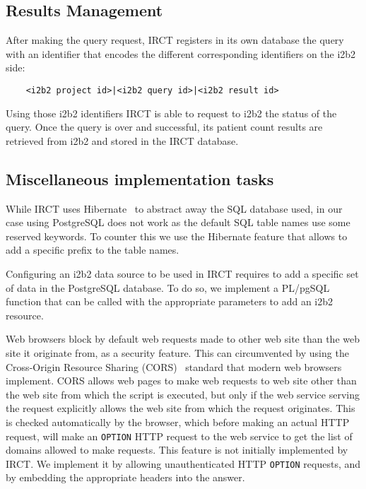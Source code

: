 \subsection{Results Management}

After making the query request, IRCT registers in its own database the query with an identifier that encodes the different corresponding identifiers on the i2b2 side:
\begin{verbatim}
    <i2b2 project id>|<i2b2 query id>|<i2b2 result id>
\end{verbatim}

Using those i2b2 identifiers IRCT is able to request to i2b2 the status of the query.
Once the query is over and successful, its patient count results are retrieved from i2b2 and stored in the IRCT database.


\subsection{Miscellaneous implementation tasks}

While IRCT uses Hibernate~\cite{todo} to abstract away the SQL database used, in our case using PostgreSQL does not work as the default SQL table names use some reserved keywords.
To counter this we use the Hibernate feature that allows to add a specific prefix to the table names.

Configuring an i2b2 data source to be used in IRCT requires to add a specific set of data in the PostgreSQL database.
To do so, we implement a PL/pgSQL function that can be called with the appropriate parameters to add an i2b2 resource.

Web browsers block by default web requests made to other web site than the web site it originate from, as a security feature.
This can circumvented by using the Cross-Origin Resource Sharing (CORS)~\cite{todo} standard that modern web browsers implement.
CORS allows web pages to make web requests to web site other than the web site from which the script is executed, but only if the web service serving the request explicitly allows the web site from which the request originates.
This is checked automatically by the browser, which before making an actual HTTP request, will make an \verb|OPTION| HTTP request to the web service to get the list of domains allowed to make requests.
This feature is not initially implemented by IRCT.
We implement it by allowing unauthenticated HTTP \verb|OPTION| requests, and by embedding the appropriate headers into the answer.

